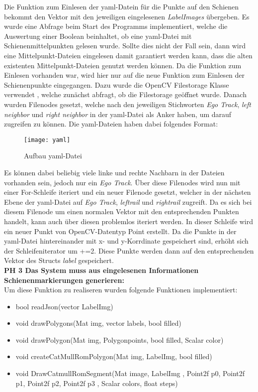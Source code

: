 \noindent
Die Funktion zum Einlesen der yaml-Datein für die Punkte auf den Schienen bekommt den Vektor mit den jeweiligen eingelesenen \textit{LabelImages} übergeben. Es wurde eine Abfrage beim Start des Programms implementiert, welche die Auswertung einer Boolean beinhaltet, ob eine yaml-Datei mit Schienenmittelpunkten gelesen wurde. Sollte dies nicht der Fall sein, dann wird eine Mittelpunkt-Dateien eingelesen damit garantiert werden kann, dass die alten existenten Mittelpunkt-Dateien genutzt werden können. Da die Funktion zum Einlesen vorhanden war, wird hier nur auf die neue Funktion zum Einlesen der Schienenpunkte eingegangen. Dazu wurde die OpenCV Filestorage Klasse verwendet , welche zunächst abfragt, ob die Filestorage geöffnet wurde. Danach wurden Filenodes gesetzt, welche nach den jeweiligen Stichworten \textit{Ego Track}, \textit{left neighbor} und \textit{right neighbor} in der yaml-Datei als Anker haben, um darauf zugreifen zu können. Die yaml-Dateien haben dabei folgendes Format:
\begin{figure}[H]
\centering
  \texttt{[image: yaml]}
  \caption{Aufbau yaml-Datei}
\end{figure}
\noindent
Es können dabei beliebig viele linke und rechte Nachbarn in der Dateien vorhanden sein, jedoch nur ein \textit{Ego Track}. Über diese Filenodes wird nun mit einer For-Schleife iteriert und ein neuer Filenode gesetzt, welcher in der nächsten Ebene der yaml-Datei auf \textit{Ego Track}, \textit{leftrail} und \textit{rightrail} zugreift. Da es sich bei diesem Filenode um einen normalen Vektor mit den entsprechenden Punkten handelt, kann auch über diesen problemlos iteriert werden. In dieser Schleife wird ein neuer Punkt von OpenCV-Datentyp Point erstellt. Da die Punkte in der yaml-Datei hintereinander mit x- und y-Korrdinate gespeichert sind, erhöht sich der Schleifeniterator um +=2. Diese Punkte werden dann auf den entsprechenden Vektor des Structs \textit{label} gespeichert.
\\

\noindent
\textbf {PH 3 Das System muss aus eingelesenen Informationen Schienenmarkierungen generieren:}
\\

\noindent
Um diese Funktion zu realiseren wurden folgende Funktionen implementiert:
\begin{itemize}
	\item bool readJson(vector LabelImg)
	\item void drawPolygons(Mat img, vector labels, bool filled)
	\item void drawPolygon(Mat img, Polygonpoints, bool filled, Scalar color)
	\item void createCatMullRomPolygon(Mat img, LabelImg, bool filled)
	\item void DrawCatmullRomSegment(Mat image, LabelImg , Point2f p0, Point2f p1, Point2f p2, Point2f p3 , Scalar colors, float steps)
\end{itemize}

